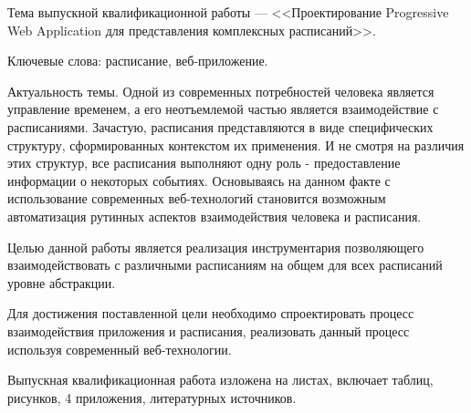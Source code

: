 
Тема выпускной квалификационной работы --- <<Проектирование Progressive Web Application для представления комплексных расписаний>>.

Ключевые слова: расписание, веб-приложение.

Актуальность темы.
Одной из современных потребностей человека является управление временем, а его неотъемлемой частью является взаимодействие с расписаниями.
Зачастую, расписания представляются в виде специфических структуру, сформированных контекстом их применения.
И не смотря на различия этих структур, все расписания выполняют одну роль - предоставление информации о некоторых событиях.
Основываясь на данном факте с использование современных веб-технологий становится возможным автоматизация рутинных аспектов взаимодействия человека и расписания.

Целью данной работы является реализация инструментария позволяющего взаимодействовать с различными расписаниям на общем для всех расписаний уровне абстракции.

Для достижения поставленной цели необходимо спроектировать процесс взаимодействия приложения и расписания, реализовать данный процесс используя современный веб-технологии.

Выпускная квалификационная работа изложена на \pageref{LastPage} листах, включает  таблиц,  рисунков, 4 приложения,  литературных источников.

\clearpage